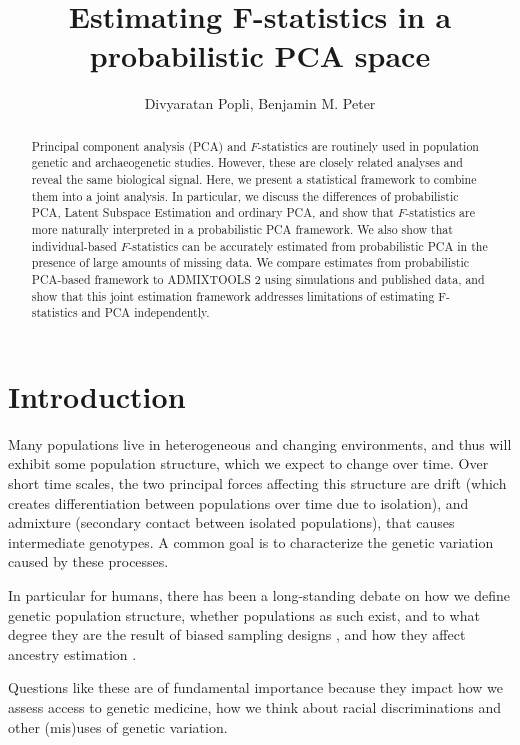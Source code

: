 \documentclass[12pt, letterpaper]{article}
\title{Estimating F-statistics in a probabilistic PCA space}
\author{Divyaratan Popli, Benjamin M. Peter}
\begin{document}
\maketitle


\begin{abstract}

\noindent Principal component analysis (PCA) and $F$-statistics are routinely used in population genetic and archaeogenetic studies. However, these are closely related analyses and reveal the same biological signal. Here, we present a statistical framework to combine them into a joint analysis. In particular, we discuss the differences of probabilistic PCA, Latent Subspace Estimation and ordinary PCA, and show that $F$-statistics are more naturally interpreted in a probabilistic PCA framework. We also show that individual-based $F$-statistics can be accurately estimated from probabilistic PCA in the presence of large amounts of missing data. We compare estimates from probabilistic PCA-based framework to ADMIXTOOLS 2 using simulations and published data, and show that this joint estimation framework addresses limitations of estimating F-statistics and PCA  independently.

\end{abstract}

\section{Introduction}
Many populations live in heterogeneous and changing environments, and thus will exhibit some population structure, which we expect to change over time. Over short time scales, the two principal forces affecting this structure are drift (which creates differentiation between populations over time due to isolation), and admixture (secondary contact between isolated populations), that causes intermediate genotypes. A common goal is to characterize the genetic variation caused by these processes.

In particular for humans, there has been a long-standing debate on how we define genetic population structure, whether populations as such exist, and to what degree they are the result of biased sampling designs \cite{serre_evidence_2004, rosenberg_clines_2005, peter_genetic_2020}, and how they affect ancestry estimation \cite{mathieson_what_2020, simon_contribution_2023}.

Questions like these are of fundamental importance because they impact how we assess access to genetic medicine, how we think about racial discriminations and other (mis)uses of genetic variation.
\end{document}
